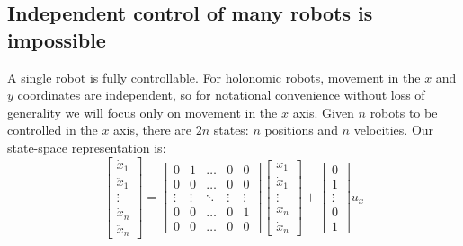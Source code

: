 \subsection{Independent control of many robots is impossible}
A single robot is fully controllable. For holonomic robots, movement in the $x$ and $y$ coordinates are independent, so for notational convenience without loss of generality we will focus only on movement in the $x$ axis. Given $n$ robots to be  controlled in the $x$ axis, there are $2n$ states: $n$ positions and $n$ velocities.
Our state-space representation is:
\begin{equation}
\begin{bmatrix}
\dot{x}_{1}\\ 
\ddot{x}_{1}\\
\vdots\\
\dot{x}_{n}\\
\ddot{x}_{n}

\end{bmatrix} = \begin{bmatrix}
0 & 1 & \ldots & 0 & 0 \\
0 & 0 & \ldots& 0 & 0 \\
\vdots &  \vdots & \ddots & \vdots & \vdots \\
0 & 0  & \ldots & 0 & 1 \\
0 & 0 & \ldots& 0 & 0 
\end{bmatrix}  \begin{bmatrix}
x_{1}\\
\dot{x}_{1}\\
\vdots \\
x_{n}\\
\dot{x}_{n}
\end{bmatrix} + \begin{bmatrix}
0\\
1\\
\vdots\\
0\\
1
\end{bmatrix} u_x
\end{equation}
